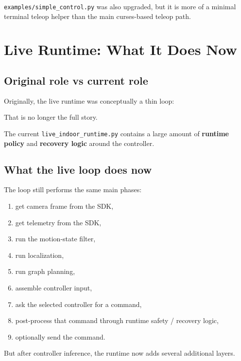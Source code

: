 \documentclass[11pt,a4paper]{article}
\begin{document}
\texttt{examples/simple\_control.py} was also upgraded, but it is more of a
minimal terminal teleop helper than the main curses-based teleop path.


\section{Live Runtime: What It Does Now}

\subsection{Original role vs current role}

Originally, the live runtime was conceptually a thin loop:

\begin{center}
\end{center}

That is no longer the full story.

The current \texttt{live\_indoor\_runtime.py} contains a large amount of
\textbf{runtime policy} and \textbf{recovery logic} around the controller.

\subsection{What the live loop does now}

The loop still performs the same main phases:

\begin{enumerate}[nosep]
  \item get camera frame from the SDK,
  \item get telemetry from the SDK,
  \item run the motion-state filter,
  \item run localization,
  \item run graph planning,
  \item assemble controller input,
  \item ask the selected controller for a command,
  \item post-process that command through runtime safety / recovery logic,
  \item optionally send the command.
\end{enumerate}

But after controller inference, the runtime now adds several additional layers.
\end{document}
